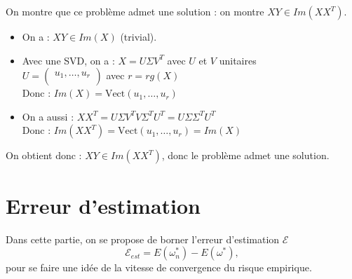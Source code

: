 \documentclass[12pt,a4paper]{article}
\begin{document}
\begin{enumerate}
    On montre que ce problème admet une solution : on montre $X Y \in Im(X X^T)$.
    \begin{itemize}
        \item On a : $X Y \in Im(X)$ (trivial).\\
        
        \item Avec une SVD, on a : $X = U \Sigma V^T$ avec $U$ et $V$ unitaires\\
        $U = \begin{pmatrix}
            u_1, \dots , u_r \\
            \end{pmatrix}$ avec $r = rg(X)$\\

        Donc : $Im(X) = \text{Vect}(u_1, \dots , u_r)$\\

        \item On a aussi : $X X^T = U \Sigma V^T V \Sigma^T U^T = U \Sigma \Sigma^T U^T$\\
        
        Donc : $Im(X X^T) = \text{Vect}(u_1, \dots , u_r) = Im(X)$\\
    \end{itemize}
    On obtient donc : $X Y \in Im(X X^T)$, donc le problème admet une solution.\\
    \color{black}
\end{enumerate}


\section{Erreur d'estimation}
Dans cette partie, on se propose de borner l’erreur d’estimation $\mathcal{E}$
$$
\mathcal{E}_{est} = E(\omega_n^*) - E(\omega^*),
$$
pour se faire une idée de la vitesse de convergence du risque empirique.\\
\end{document}
